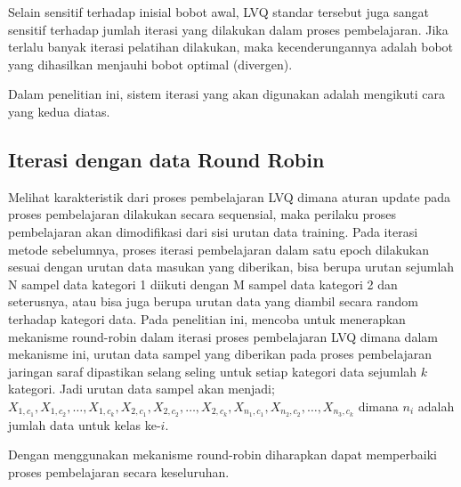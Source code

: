 Selain sensitif terhadap inisial bobot awal, LVQ standar tersebut juga sangat
sensitif terhadap jumlah iterasi yang dilakukan dalam proses pembelajaran. Jika
terlalu banyak iterasi pelatihan dilakukan, maka kecenderungannya adalah bobot
yang dihasilkan menjauhi bobot optimal (divergen)\cite{Sato:1995}.

\noindent Dalam penelitian ini, sistem iterasi yang akan digunakan adalah
mengikuti cara yang kedua diatas.
% 
% 
\subsection{Iterasi dengan data Round Robin}
Melihat karakteristik dari proses pembelajaran LVQ dimana aturan update pada
proses pembelajaran dilakukan secara sequensial, maka perilaku proses
pembelajaran akan dimodifikasi dari sisi urutan data training. Pada iterasi metode sebelumnya,
proses iterasi pembelajaran dalam satu epoch dilakukan sesuai  dengan urutan
data masukan yang diberikan, bisa berupa urutan sejumlah N sampel data kategori
1 diikuti dengan  M sampel data kategori 2 dan seterusnya, atau bisa juga berupa
urutan data yang diambil secara random terhadap kategori data. Pada penelitian ini, \saya
mencoba untuk menerapkan mekanisme round-robin dalam iterasi proses pembelajaran
LVQ dimana dalam mekanisme ini, urutan data sampel yang diberikan pada proses
pembelajaran jaringan saraf dipastikan selang seling untuk setiap kategori data
sejumlah $k$ kategori. Jadi urutan data sampel akan menjadi; $X_{1,c_1},
X_{1,c_2}, \dots, X_{1,c_k}, X_{2,c_1}, X_{2,c_2}, \dots, X_{2,c_k},
X_{n_1,c_1},X_{n_2,c_2}, \dots,X_{n_3,c_k}$ dimana $n_i$ adalah jumlah data
untuk kelas ke-$i$.

Dengan menggunakan mekanisme round-robin diharapkan dapat memperbaiki proses
pembelajaran secara keseluruhan.


% 

